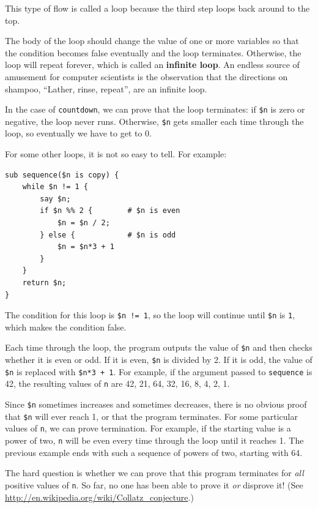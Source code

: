 This type of flow is called a loop because the third step
loops back around to the top.  

The body of the loop should change the value of one or more variables
so that the condition becomes false eventually and the loop
terminates.  Otherwise, the loop will repeat forever, which is called
an {\bf infinite loop}.  An endless source of amusement for computer
scientists is the observation that the directions on shampoo,
``Lather, rinse, repeat'', are an infinite loop.

In the case of {\tt countdown}, we can prove that the loop
terminates: if {\tt \$n} is zero or negative, the loop never runs.
Otherwise, {\tt \$n} gets smaller each time through the
loop, so eventually we have to get to 0.

For some other loops, it is not so easy to tell.  For example:

\begin{verbatim}
sub sequence($n is copy) {
    while $n != 1 {
        say $n;
        if $n %% 2 {        # $n is even
            $n = $n / 2;
        } else {            # $n is odd
            $n = $n*3 + 1
        }
    }
    return $n;
}
\end{verbatim}
%
The condition for this loop is {\tt \$n != 1}, so the loop will continue
until {\tt \$n} is {\tt 1}, which makes the condition false.

Each time through the loop, the program outputs the value of {\tt \$n}
and then checks whether it is even or odd.  If it is even, {\tt \$n} is
divided by 2.  If it is odd, the value of {\tt \$n} is replaced with
{\tt \$n*3 + 1}. For example, if the argument passed to {\tt sequence}
is 42, the resulting values of {\tt n} are 42, 21, 64, 32, 16, 8, 4, 2, 1.

Since {\tt \$n} sometimes increases and sometimes decreases, there is no
obvious proof that {\tt \$n} will ever reach 1, or that the program
terminates.  For some particular values of {\tt n}, we can prove
termination.  For example, if the starting value is a power of two,
{\tt n} will be even every time through the loop
until it reaches 1. The previous example ends with such a sequence
of powers of two, starting with 64.

The hard question is whether we can prove that this program terminates
for {\em all} positive values of {\tt n}.  So far, no one has
been able to prove it {\em or} disprove it!  (See
\url{http://en.wikipedia.org/wiki/Collatz_conjecture}.)


